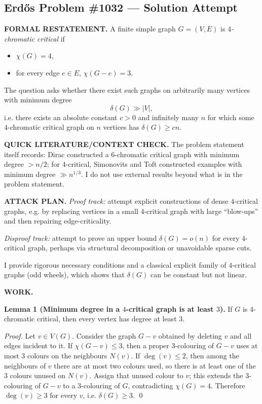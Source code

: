 \subsection*{Erd\H{o}s Problem \#1032 --- Solution Attempt}

\textbf{FORMAL RESTATEMENT.}
A finite simple graph $G=(V,E)$ is \emph{$4$-chromatic critical} if
\begin{itemize}
\item $\chi(G)=4$,
\item for every edge $e\in E$, $\chi(G-e)=3$.
\end{itemize}
The question asks whether there exist such graphs on arbitrarily many vertices with minimum degree
\[\delta(G) \gg |V|,\]
i.e. there exists an absolute constant $c>0$ and infinitely many $n$ for which some $4$-chromatic critical graph on $n$ vertices has $\delta(G)\ge cn$.

\textbf{QUICK LITERATURE/CONTEXT CHECK.}
The problem statement itself records:
Dirac constructed a $6$-chromatic critical graph with minimum degree $>n/2$; for $4$-critical, Simonovits and Toft constructed examples with minimum degree $\gg n^{1/3}$.
I do not use external results beyond what is in the problem statement.

\textbf{ATTACK PLAN.}
\emph{Proof track:} attempt explicit constructions of dense $4$-critical graphs, e.g. by replacing vertices in a small $4$-critical graph with large ``blow-ups'' and then repairing edge-criticality.

\emph{Disproof track:} attempt to prove an upper bound $\delta(G)=o(n)$ for every $4$-critical graph, perhaps via structural decomposition or unavoidable sparse cuts.

I provide rigorous necessary conditions and a classical explicit family of $4$-critical graphs (odd wheels), which shows that $\delta(G)$ can be constant but not linear.

\textbf{WORK.}

\textbf{Lemma 1 (Minimum degree in a $4$-critical graph is at least $3$).}
If $G$ is $4$-chromatic critical, then every vertex has degree at least $3$.

\emph{Proof.}
Let $v\in V(G)$. Consider the graph $G-v$ obtained by deleting $v$ and all edges incident to it.
If $\chi(G-v)\le 3$, then a proper 3-colouring of $G-v$ uses at most 3 colours on the neighbours $N(v)$.
If $\deg(v)\le 2$, then among the neighbours of $v$ there are at most two colours used, so there is at least one of the 3 colours unused on $N(v)$.
Assign that unused colour to $v$; this extends the 3-colouring of $G-v$ to a 3-colouring of $G$, contradicting $\chi(G)=4$.
Therefore $\deg(v)\ge 3$ for every $v$, i.e. $\delta(G)\ge 3$.
\qed

